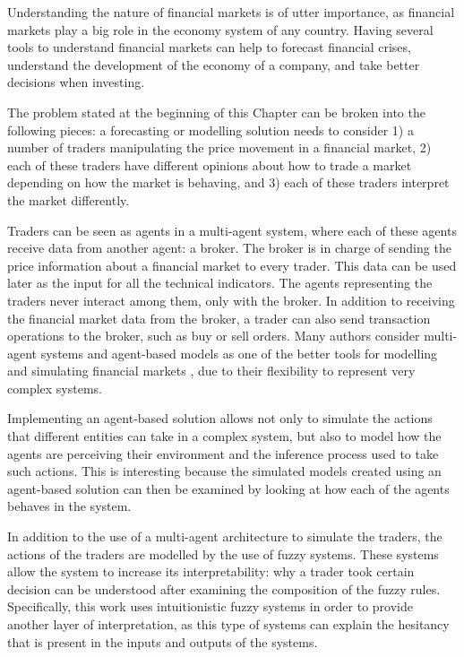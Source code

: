 Understanding the nature of financial markets is of utter importance, as
financial markets play a big role in the economy system of any country. Having
several tools to understand financial markets can help to forecast financial
crises, understand the development of the economy of a company, and take better
decisions when investing.

The problem stated at the beginning of this Chapter can be
broken into the following pieces: a forecasting or modelling solution needs to
consider 1) a number of traders manipulating the price movement in a financial
market, 2) each of these traders have different opinions about how to trade a
market depending on how the market is behaving, and 3) each of these traders
interpret the market differently.

Traders can be seen as agents in a multi-agent system, where each of these
agents receive data from another agent: a broker. The broker is in charge of
sending the price information about a financial market to every trader. This
data can be used later as the input for all the technical indicators. The agents
representing the traders never interact among them, only with the broker. In
addition to receiving the financial market data from the broker, a trader can
also send transaction operations to the broker, such as buy or sell orders. Many
authors consider multi-agent systems and agent-based models as one of the better
tools for modelling and simulating financial markets \cite{Lebaron2001}
\cite{Gamil2007} \cite{Boer-Sorban2008} \cite{Suarez2008} \cite{Suarez2012}, due
to their flexibility to represent very complex systems. %

Implementing an agent-based solution allows not only to simulate the actions
that different entities can take in a complex system, but also to model how the
agents are perceiving their environment and the inference process used to take
such actions. This is interesting because the simulated models created using an
agent-based solution can then be examined by looking at how each of the agents
behaves in the system.

In addition to the use of a multi-agent architecture to simulate the traders,
the actions of the traders are modelled by the use of fuzzy systems. These
systems allow the system to increase its interpretability: why a trader took
certain decision can be understood after examining the composition of the fuzzy
rules. Specifically, this work uses intuitionistic fuzzy systems in order to
provide another layer of interpretation, as this type of systems can explain the
hesitancy that is present in the inputs and outputs of the systems.

